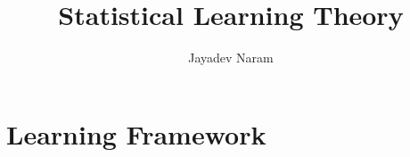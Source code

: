 \documentclass[11pt,a4paper]{article}
\author{Jayadev Naram}
\title{Statistical Learning Theory}
\begin{document}
\date{}
\maketitle
\tableofcontents
\newpage

\theoremstyle{plain}
\newtheorem{theorem}{Theorem}[section]
\newtheorem{corollary}[theorem]{Corollary}
\newtheorem{lemma}[theorem]{Lemma}
\newtheorem{prop}[theorem]{Proposition}
\newtheorem{assume}{Assumption}
\newtheorem{remark}[theorem]{Remark}

\theoremstyle{definition}
\newtheorem{mydef}[theorem]{Definition}
\newtheorem{example}[theorem]{Example}

\newcommand{\R}{\mathbb{R}}
\newcommand{\A}{\mathcal{A}}
\newcommand{\M}{\mathcal{M}}
\newcommand{\N}{\mathcal{N}}
\newcommand{\h}{\mathcal{H}}
\newcommand{\T}{\mathcal{T}}
\newcommand{\Prob}{\mathbb{P}}
\newcommand{\Dist}{\mathcal{D}}
\newcommand{\perpProj}{\mathcal{P}^\perp}
\newcommand{\bb}{\mathbb{B}}
\newcommand{\Sprod}{\mathbb{S}_{xy}}
\newcommand{\highlight}[1]{\textsl{\textbf{#1}}}
\newcommand{\mapping}[3]{#1:#2\rightarrow #3}
\newcommand{\doubt}{\highlight{[??]}}
\newcommand{\bigvert}[2]{\left.#1\right|_{#2}}
\newcommand{\sdnn}[1]{${#1}$}
\newcommand{\bsdnn}[1]{$\boldsymbol{#1}$}
\newcommand{\ifthen}[2]{\textbf{(#1)}\boldsymbol{\implies}\textbf{(#2)}}
\newcommand{\bsdn}[1]{\boldsymbol{#1}}
\newcommand{\forward}{$(\implies)$}
\newcommand{\converse}{$(\impliedby)$}
\newcommand{\Lt}[1]{\underset{#1\rightarrow 0}{Lt}}
\newcommand{\norm}[1]{\|#1\|}
\newcommand{\dparder}[2]{\dfrac{\partial #1}{\partial x_{#2}}}
\newcommand{\fparder}[2]{\frac{\partial #1}{\partial x_{#2}}}
\newcommand{\parder}[2]{\partial #1/\partial x_{#2}}
\newcommand{\parop}[1]{\dfrac{\partial}{\partial x_{#1}}}
\newcommand{\innerproduct}[2]{\langle #1, #2 \rangle}
\newcommand{\genst}{St_B(n,p)}
\newcommand{\igenst}[1]{St_{B_{#1}}(n_{#1},p)}
\newcommand{\realmat}[2]{\R^{#1\times #2}}
\newcommand{\Skew}{\mathcal{S}_{skew}(p)}
\newcommand{\Sym}{\mathcal{S}_{sym}(p)}
\newcommand{\XperpB}{X_{B^\perp}}
\newcommand{\polarRetr}{R^{polar}_X}
\newcommand{\qrRetr}{R^{QR}_X}
\newcommand{\vectransport}{\mathcal{T}}
\newcommand{\grad}{\text{grad}\,}
\newcommand{\hess}{\text{Hess}\,}

\section{Learning Framework}
\end{document}
